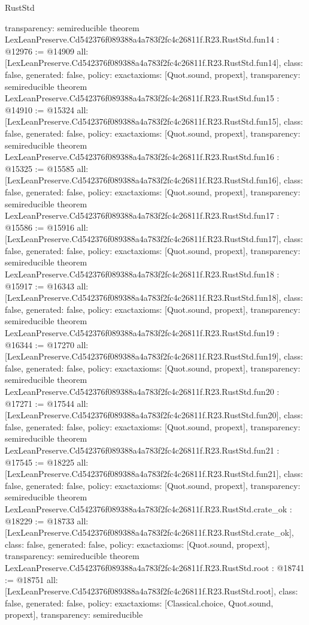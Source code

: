 \begin{lexlean}{RustStd}
\begin{coremodule}
{  transparency: semireducible
}
theorem LexLeanPreserve.Cd542376f089388a4a783f2fc4c26811f.R23.RustStd.fun14 : @12976 := @14909 {
  all: [LexLeanPreserve.Cd542376f089388a4a783f2fc4c26811f.R23.RustStd.fun14],
  class: false,
  generated: false,
  policy: exact{axioms: [Quot.sound, propext]},
  transparency: semireducible
}
theorem LexLeanPreserve.Cd542376f089388a4a783f2fc4c26811f.R23.RustStd.fun15 : @14910 := @15324 {
  all: [LexLeanPreserve.Cd542376f089388a4a783f2fc4c26811f.R23.RustStd.fun15],
  class: false,
  generated: false,
  policy: exact{axioms: [Quot.sound, propext]},
  transparency: semireducible
}
theorem LexLeanPreserve.Cd542376f089388a4a783f2fc4c26811f.R23.RustStd.fun16 : @15325 := @15585 {
  all: [LexLeanPreserve.Cd542376f089388a4a783f2fc4c26811f.R23.RustStd.fun16],
  class: false,
  generated: false,
  policy: exact{axioms: [Quot.sound, propext]},
  transparency: semireducible
}
theorem LexLeanPreserve.Cd542376f089388a4a783f2fc4c26811f.R23.RustStd.fun17 : @15586 := @15916 {
  all: [LexLeanPreserve.Cd542376f089388a4a783f2fc4c26811f.R23.RustStd.fun17],
  class: false,
  generated: false,
  policy: exact{axioms: [Quot.sound, propext]},
  transparency: semireducible
}
theorem LexLeanPreserve.Cd542376f089388a4a783f2fc4c26811f.R23.RustStd.fun18 : @15917 := @16343 {
  all: [LexLeanPreserve.Cd542376f089388a4a783f2fc4c26811f.R23.RustStd.fun18],
  class: false,
  generated: false,
  policy: exact{axioms: [Quot.sound, propext]},
  transparency: semireducible
}
theorem LexLeanPreserve.Cd542376f089388a4a783f2fc4c26811f.R23.RustStd.fun19 : @16344 := @17270 {
  all: [LexLeanPreserve.Cd542376f089388a4a783f2fc4c26811f.R23.RustStd.fun19],
  class: false,
  generated: false,
  policy: exact{axioms: [Quot.sound, propext]},
  transparency: semireducible
}
theorem LexLeanPreserve.Cd542376f089388a4a783f2fc4c26811f.R23.RustStd.fun20 : @17271 := @17544 {
  all: [LexLeanPreserve.Cd542376f089388a4a783f2fc4c26811f.R23.RustStd.fun20],
  class: false,
  generated: false,
  policy: exact{axioms: [Quot.sound, propext]},
  transparency: semireducible
}
theorem LexLeanPreserve.Cd542376f089388a4a783f2fc4c26811f.R23.RustStd.fun21 : @17545 := @18225 {
  all: [LexLeanPreserve.Cd542376f089388a4a783f2fc4c26811f.R23.RustStd.fun21],
  class: false,
  generated: false,
  policy: exact{axioms: [Quot.sound, propext]},
  transparency: semireducible
}
theorem LexLeanPreserve.Cd542376f089388a4a783f2fc4c26811f.R23.RustStd.crate_ok : @18229 := @18733 {
  all: [LexLeanPreserve.Cd542376f089388a4a783f2fc4c26811f.R23.RustStd.crate_ok],
  class: false,
  generated: false,
  policy: exact{axioms: [Quot.sound, propext]},
  transparency: semireducible
}
theorem LexLeanPreserve.Cd542376f089388a4a783f2fc4c26811f.R23.RustStd.root : @18741 := @18751 {
  all: [LexLeanPreserve.Cd542376f089388a4a783f2fc4c26811f.R23.RustStd.root],
  class: false,
  generated: false,
  policy: exact{axioms: [Classical.choice, Quot.sound, propext]},
  transparency: semireducible
}


\end{coremodule}
\end{lexlean}
